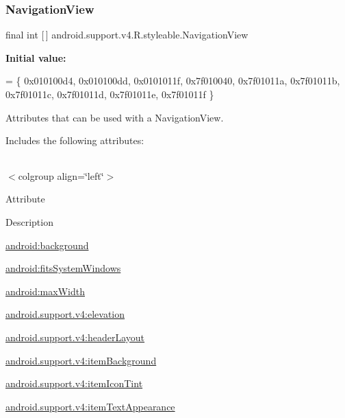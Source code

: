 \subsubsection{\texorpdfstring{Navigation\+View}{NavigationView}}
{\footnotesize\ttfamily final int \mbox{[}$\,$\mbox{]} android.\+support.\+v4.\+R.\+styleable.\+Navigation\+View\hspace{0.3cm}{\ttfamily [static]}}

{\bfseries Initial value\+:}
\begin{DoxyCode}
= \{
            0x010100d4, 0x010100dd, 0x0101011f, 0x7f010040,
            0x7f01011a, 0x7f01011b, 0x7f01011c, 0x7f01011d,
            0x7f01011e, 0x7f01011f
        \}
\end{DoxyCode}
Attributes that can be used with a Navigation\+View. 

Includes the following attributes\+:

\tabulinesep=1mm
\begin{longtabu} spread 0pt [c]{*{0}{|X[-1]}|}
\hline
\end{longtabu}
$<$colgroup align=\char`\"{}left\char`\"{}$>$ 

Attribute

Description 

{\ttfamily \hyperlink{classandroid_1_1support_1_1v4_1_1R_1_1styleable_a8f98df409afda107e7ee23053b8a05b9}{android\+:background}}

{\ttfamily \hyperlink{classandroid_1_1support_1_1v4_1_1R_1_1styleable_a8517e1a9f5ffb52c3548a89bc9417529}{android\+:fits\+System\+Windows}}

{\ttfamily \hyperlink{classandroid_1_1support_1_1v4_1_1R_1_1styleable_ad0e7d3e854013e3ffc4d6bc317d99c0c}{android\+:max\+Width}}

{\ttfamily \hyperlink{classandroid_1_1support_1_1v4_1_1R_1_1styleable_ac60a6df259fa99f7015ffb729a6e9f61}{android.\+support.\+v4\+:elevation}}

{\ttfamily \hyperlink{classandroid_1_1support_1_1v4_1_1R_1_1styleable_a8beaea7d5f50233cb1a16143dfc217c8}{android.\+support.\+v4\+:header\+Layout}}

{\ttfamily \hyperlink{classandroid_1_1support_1_1v4_1_1R_1_1styleable_afc0d87aca6dd3fb4c0540b58a90cca8e}{android.\+support.\+v4\+:item\+Background}}

{\ttfamily \hyperlink{classandroid_1_1support_1_1v4_1_1R_1_1styleable_a66c3c759347c63fdcb441cb6933140c5}{android.\+support.\+v4\+:item\+Icon\+Tint}}

{\ttfamily \hyperlink{classandroid_1_1support_1_1v4_1_1R_1_1styleable_a349ff552ebf7326a68f420379297db8e}{android.\+support.\+v4\+:item\+Text\+Appearance}}

